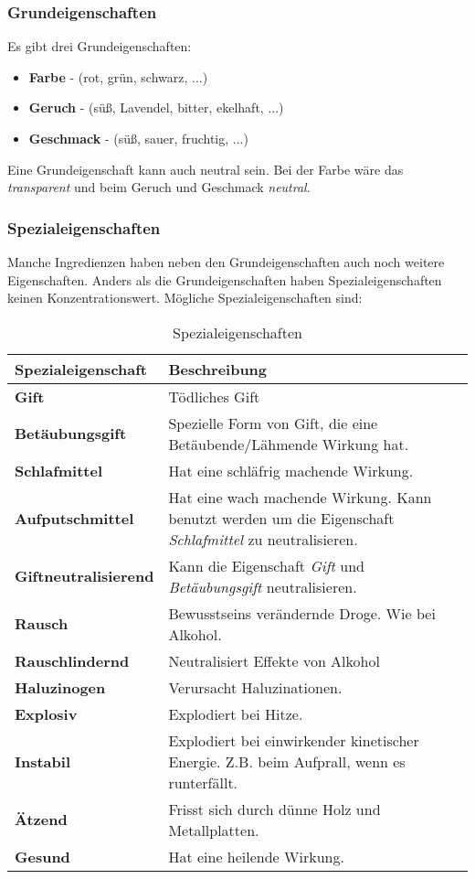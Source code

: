 \subsubsection{Grundeigenschaften}
Es gibt drei Grundeigenschaften:
\begin{itemize}
\item \textbf{Farbe} - (rot, grün, schwarz, ...)
\item \textbf{Geruch} - (süß, Lavendel, bitter, ekelhaft, ...)
\item \textbf{Geschmack} - (süß, sauer, fruchtig, ...)
\end{itemize}

Eine Grundeigenschaft kann auch neutral sein. Bei der Farbe wäre das \textit{transparent} und beim Geruch und Geschmack \textit{neutral}. 

\subsubsection{Spezialeigenschaften}
\label{chap:spezialeigenschaften}
Manche Ingredienzen haben neben den Grundeigenschaften auch noch weitere Eigenschaften. Anders als die Grundeigenschaften haben Spezialeigenschaften keinen Konzentrationswert. Mögliche Spezialeigenschaften sind:

\begin{table}[h]
\begin{center}
\begin{tabular}{|p{}|p{11cm}|}
\hline
\textbf{Spezialeigenschaft} & \textbf{Beschreibung} \\ \hline
\textbf{Gift} & Tödliches Gift \\ \hline
\textbf{Betäubungsgift} & Spezielle Form von Gift, die eine Betäubende/Lähmende Wirkung hat. \\ \hline
\textbf{Schlafmittel} & Hat eine schläfrig machende Wirkung. \\ \hline
\textbf{Aufputschmittel} & Hat eine wach machende Wirkung. Kann benutzt werden um die Eigenschaft \textit{Schlafmittel} zu neutralisieren. \\ \hline
\textbf{Giftneutralisierend} & Kann die Eigenschaft \textit{Gift} und \textit{Betäubungsgift} neutralisieren. \\ \hline
\textbf{Rausch} & Bewusstseins verändernde Droge. Wie bei Alkohol. \\ \hline
\textbf{Rauschlindernd} & Neutralisiert Effekte von Alkohol \\ \hline
\textbf{Haluzinogen} & Verursacht Haluzinationen. \\ \hline
\textbf{Explosiv} & Explodiert bei Hitze. \\ \hline
\textbf{Instabil} & Explodiert bei einwirkender kinetischer Energie. Z.B. beim Aufprall, wenn es runterfällt. \\ \hline
\textbf{Ätzend} & Frisst sich durch dünne Holz und Metallplatten. \\ \hline
\textbf{Gesund} & Hat eine heilende Wirkung. \\ \hline
\end{tabular}
\end{center}
\caption{Spezialeigenschaften}
\label{tab:spezialeigenschaften}
\end{table}


